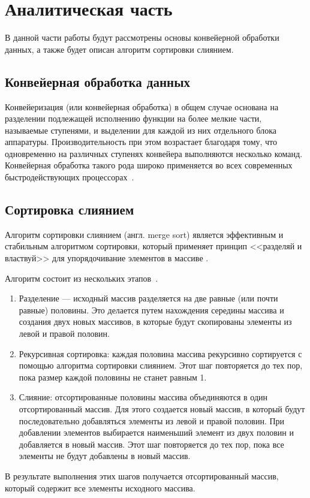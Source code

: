 \chapter{Аналитическая часть}
В данной части работы будут рассмотрены основы конвейерной обработки данных, а также будет описан алгоритм сортировки слиянием.

\section{Конвейерная обработка данных}
Конвейеризация (или конвейерная обработка) в общем случае основана на разделении подлежащей исполнению функции на более мелкие части, называемые ступенями, и выделении для каждой из них отдельного блока аппаратуры. Производительность при этом возрастает благодаря тому, что одновременно на различных ступенях конвейера выполняются несколько команд. Конвейерная обработка такого рода широко применяется во всех современных быстродействующих процессорах~\cite{conveyor_desc}.

\section{Сортировка слиянием}
Алгоритм сортировки слиянием (англ. merge sort) является эффективным и стабильным алгоритмом сортировки, который применяет принцип <<разделяй и властвуй>> для упорядочивание элементов в массиве \cite{merge-sort}.

Алгоритм состоит из нескольких этапов~\cite{merge-sort}.
\begin{enumerate}
	\item Разделение ---  исходный массив разделяется на две равные (или почти равные) половины. Это делается путем нахождения середины массива и создания двух новых массивов, в которые будут скопированы элементы из левой и правой половин.
	
	\item Рекурсивная сортировка: каждая половина массива рекурсивно сортируется с помощью алгоритма сортировки слиянием. Этот шаг повторяется до тех пор, пока размер каждой половины не станет равным 1.
	
	\item Слияние: отсортированные половины массива объединяются в один отсортированный массив. Для этого создается новый массив, в который будут последовательно добавляться элементы из левой и правой половин. При добавлении элементов выбирается наименьший элемент из двух половин и добавляется в новый массив. Этот шаг повторяется до тех пор, пока все элементы не будут добавлены в новый массив.
\end{enumerate}
В результате выполнения этих шагов получается отсортированный массив, который содержит все элементы исходного массива.


